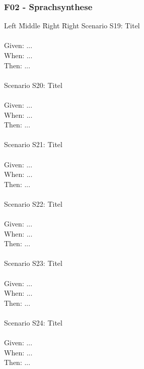 \subsubsection*{F02 - Sprachsynthese}
\begin{tabbing}
    Left \= Middle \= Right \= Right \kill
    Scenario S19: \> \> \> Titel \\ \\
    Given:  \> \> \> ...\\
    When:   \> \> \> ...\\
    Then:   \> \> \> ...\\
    \\
    Scenario S20: \> \> \> Titel \\ \\
    Given:  \> \> \> ...\\
    When:   \> \> \> ...\\
    Then:   \> \> \> ...\\
    \\
    Scenario S21: \> \> \> Titel \\ \\
    Given:  \> \> \> ...\\
    When:   \> \> \> ...\\
    Then:   \> \> \> ...\\
    \\
    Scenario S22: \> \> \> Titel \\ \\
    Given:  \> \> \> ...\\
    When:   \> \> \> ...\\
    Then:   \> \> \> ...\\
    \\
    Scenario S23: \> \> \> Titel \\ \\
    Given:  \> \> \> ...\\
    When:   \> \> \> ...\\
    Then:   \> \> \> ...\\
    \\
    Scenario S24: \> \> \> Titel \\ \\
    Given:  \> \> \> ...\\
    When:   \> \> \> ...\\
    Then:   \> \> \> ...\\
    \\
\end{tabbing}
